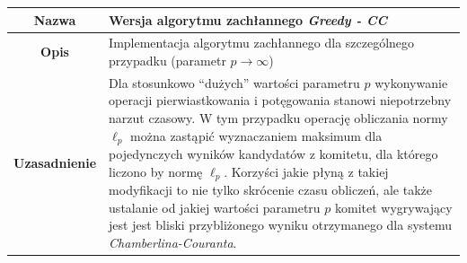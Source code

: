 \documentclass[polish,11pt]{aghthesis}
\begin{document}
{
\centering
\begin{tabular}{|c|p{10cm}|}
\hline
\textbf{Nazwa} & Wersja algorytmu zachłannego \textit{Greedy - CC} \\ 
\hline 
\textbf{Opis} & Implementacja algorytmu zachłannego dla szczególnego przypadku
(parametr $p \to \infty$) \\ 
\hline 
\textbf{Uzasadnienie} & Dla stosunkowo ``dużych'' wartości parametru $p$ wykonywanie operacji
pierwiastkowania i potęgowania stanowi niepotrzebny narzut czasowy.
W tym przypadku operację obliczania normy $\ell_p$ można zastąpić
wyznaczaniem maksimum dla pojedynczych wyników kandydatów z
komitetu, dla którego liczono by normę $\ell_p$.
Korzyści jakie płyną z takiej modyfikacji to nie tylko skrócenie czasu
obliczeń, ale także ustalanie od jakiej wartości parametru $p$ komitet
wygrywający jest jest bliski przybliżonego wyniku otrzymanego dla systemu
\textit{Chamberlina-Couranta}.\\ 
\hline 
\end{tabular} 
}
\vspace{\baselineskip}
\end{document}

